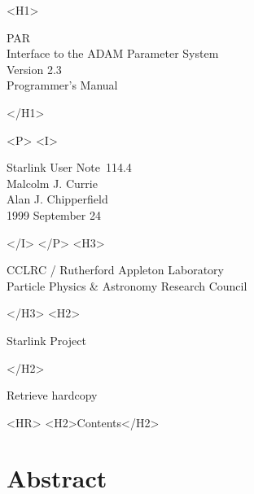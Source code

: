 \documentclass[twoside,11pt]{article}
\newcommand{\stardoccategory}  {Starlink User Note}
\newcommand{\stardocsource}    {sun\stardocnumber}
\newcommand{\stardocnumber}    {114.4}
\newcommand{\stardocauthors}   {Malcolm J. Currie\\
                                Alan J. Chipperfield}
\newcommand{\stardocdate}      {1999 September 24}
\newcommand{\stardoctitle}     {PAR \\ [\latex{1ex}]
                                Interface to the ADAM
                                Parameter System}
\newcommand{\stardocversion}   {Version 2.3}
\newcommand{\stardocmanual}    {Programmer's Manual}
\newcommand{\htmladdnormallink}[2]{#1}
\newcommand{\htmladdimg}[1]{}
\newcommand{\htmlref}[2]{#1}
\newcommand{\htmladdtonavigation}[1]{}
\newcommand{\xlabel}[1]{}
\newcommand{\latex}[1]{#1}
\begin{document}
\begin{htmlonly}
   \xlabel{}
   \begin{rawhtml} <H1> \end{rawhtml}
      \stardoctitle\\
      \stardocversion\\
      \stardocmanual
   \begin{rawhtml} </H1> \end{rawhtml}


   \begin{rawhtml} <P> <I> \end{rawhtml}
   \stardoccategory\ \stardocnumber \\
   \stardocauthors \\
   \stardocdate
   \begin{rawhtml} </I> </P> <H3> \end{rawhtml}
      \htmladdnormallink{CCLRC}{http://www.cclrc.ac.uk} /
      \htmladdnormallink{Rutherford Appleton Laboratory}
                        {http://www.cclrc.ac.uk/ral} \\
      \htmladdnormallink{Particle Physics \& Astronomy Research Council}
                        {http://www.pparc.ac.uk} \\
   \begin{rawhtml} </H3> <H2> \end{rawhtml}
      \htmladdnormallink{Starlink Project}{http://www.starlink.ac.uk/}
   \begin{rawhtml} </H2> \end{rawhtml}
   \htmladdnormallink{\htmladdimg{source.gif} Retrieve hardcopy}
      {http://www.starlink.ac.uk/cgi-bin/hcserver?\stardocsource}\\

  \label{stardoccontents}
  \begin{rawhtml} 
    <HR>
    <H2>Contents</H2>
  \end{rawhtml}
  \htmladdtonavigation{\htmlref{\htmladdimg{contents_motif.gif}}
        {stardoccontents}}

  \section{\xlabel{abstract}Abstract}
\end{htmlonly}
\end{document}
